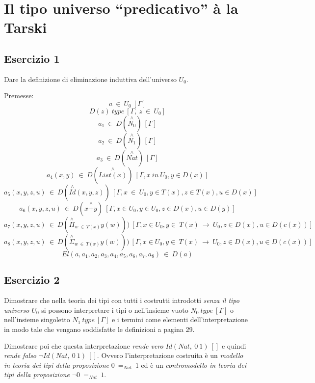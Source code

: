 \section{Il tipo universo ``predicativo'' à la Tarski}
\subsection{Esercizio 1}
\begin{thm}
	Dare la definizione di eliminazione induttiva dell'universo $U_0$.
\end{thm}
Premesse:
\[a~\in~U_0~[\Gamma]\]
\[D(z)~type~[\Gamma,~z~\in~U_0]\]
\[a_1~\in~D(\stackrel{\wedge}{N_0})~[\Gamma]\]
\[a_2~\in~D(\stackrel{\wedge}{N_1})~[\Gamma]\]
\[a_3~\in~D(\stackrel{\wedge}{Nat})~[\Gamma]\]
\[a_4(x,y)~\in~D(\stackrel{\wedge}{List(x)})~[\Gamma,x~in~U_0,y\in D(x)]\]
\[a_5(x,y,z,u)~\in~D(\stackrel{\wedge}{Id}(x,y,z))~[\Gamma,x~\in~U_0,y\in T(x),z\in T(x), u\in D(x)]\]
\[a_6(x,y,z,u)~\in~D(x\stackrel{\wedge}{+}y)~[\Gamma,x\in U_0,y\in U_0,z\in D(x), u\in D(y)]\]
\[a_7(x,y,z,u)~\in~D(\stackrel{\wedge}{\Pi}_{w~\in~T(x)}y(w)))~[\Gamma,x\in U_0,y\in~T(x)~\to~U_0,z\in D(x), u\in D(c(x))]\]
\[a_8(x,y,z,u)~\in~D(\stackrel{\wedge}{\Sigma}_{w~\in~T(x)}y(w)))~[\Gamma,x\in U_0,y\in~T(x)~\to~U_0,z\in D(x), u\in D(c(x))]\]
\noindent\makebox[\linewidth]{\rule{\paperwidth}{0.4pt}}
\[El(a,a_1,a_2,a_3,a_4,a_5,a_6,a_7,a_8)~\in~D(a)\]

\subsection{Esercizio 2}
\begin{thm}
	Dimostrare che nella teoria dei tipi con tutti i costrutti introdotti \textit{senza il tipo universo $U_0$} si possono interpretare i tipi o nell'insieme vuoto $N_0~type~[\Gamma]$ o nell'insieme singoletto $N_1~type~[\Gamma]$ e i termini come elementi dell'interpretazione in modo tale che vengano soddisfatte le definizioni a pagina 29.
	
	Dimostrare poi che questa interpretazione \textit{rende vero} $Id(Nat,~0~1)~[]$ e quindi \textit{rende falso} $\neg Id(Nat,~0~1)~[]$. Ovvero l'interpretazione costruita è un \textit{modello in teoria dei tipi della proposizione} $0~=_{Nat}~1$ ed è un \textit{contromodello in teoria dei tipi della proposizione} $\neg 0~=_{Nat}~1$.
\end{thm}


